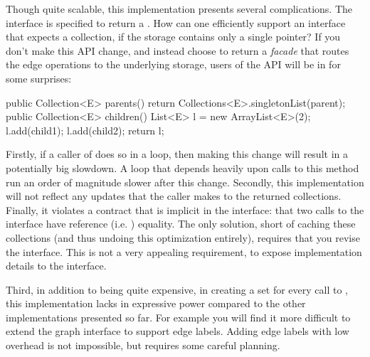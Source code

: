 Though quite scalable, this implementation presents several complications.
The  interface is specified to return a
. How can one efficiently support an interface that expects a
collection, if the storage contains only a single pointer? If you don't make
this API change, and instead choose to return a \emph{facade} that routes the
edge operations to the underlying storage, users of the API will be in for some
surprises:
\begin{shortlisting}
public Collection<E> parents() {
   return Collections<E>.singletonList(parent);
}
public Collection<E> children() {
   List<E> l = new ArrayList<E>(2);
   l.add(child1); l.add(child2);
   return l;
}
\end{shortlisting}
Firstly, if a caller of  does so in a loop, then making this
change will result in a potentially big slowdown. A loop that
depends heavily upon calls to this method run an order of magnitude slower
after this change.
Secondly, this implementation will not reflect any updates that the
caller makes to the returned collections. Finally, it violates a contract
that is implicit in the interface: that two calls to the 
interface have reference (i.e. \code{==}) equality.
The only solution, short of caching these collections (and thus undoing this
optimization entirely), requires that you revise the 
interface. This is not a very appealing requirement, to expose implementation
details to the interface.

Third, in addition to being quite expensive, in creating a set for every call to
, this implementation lacks in expressive power compared to the
other implementations presented so far. For example you will find it more
difficult to extend the graph interface to support edge labels. Adding edge
labels with low overhead is not impossible, but requires some careful planning.

